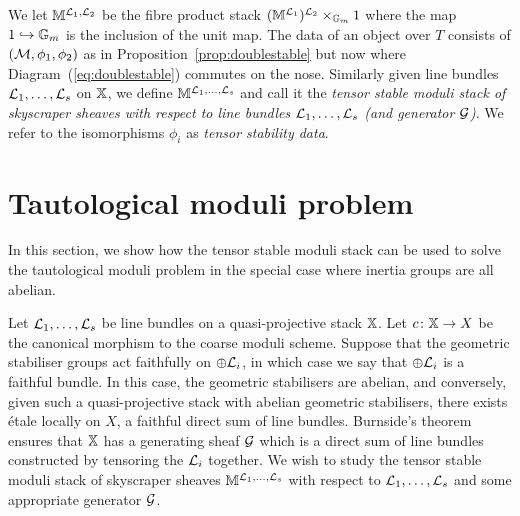 \documentclass[12pt]{amsart}
\begin{document}
\begin{definition}  \label{defn:doubletensor}
We let $\mathbb{M}^{\mathcal{L}_1,\mathcal{L}_2}$ be the fibre product stack $(\mathbb{M}^{\mathcal{L}_1})^{\mathcal{L}_2} \times_{\mathbb{G}_m} 1$ where the map $1 \hookrightarrow \mathbb{G}_m$ is the inclusion of the unit map. The data of an object over $T$ consists of $(\mathcal{M}, \phi_1, \phi_2)$ as in Proposition~\ref{prop:doublestable} but now where Diagram~(\ref{eq:doublestable}) commutes on the nose. Similarly given line bundles $\mathcal{L}_1,\ldots,\mathcal{L}_s$ on $\mathbb{X}$, we define $\mathbb{M}^{\mathcal{L}_1,\ldots,\mathcal{L}_s}$ and call it the {\em tensor stable moduli stack of skyscraper sheaves with respect to line bundles $\mathcal{L}_1, \ldots, \mathcal{L}_s$ (and generator $\mathcal{G}$)}. We refer to the isomorphisms $\phi_i$ as {\em tensor stability data}.
\end{definition}



\section{Tautological moduli problem}

In this section, we show how the tensor stable moduli stack can be used to solve the tautological moduli problem in the special case where inertia groups are all abelian.

Let $\mathcal{L}_1, \ldots, \mathcal{L}_s$ be line bundles on a quasi-projective stack $\mathbb{X}$. Let $c \colon \mathbb{X} \to X$ be the canonical morphism to the coarse moduli scheme. Suppose that the geometric stabiliser groups act faithfully on $\oplus \mathcal{L}_i$, in which case we say that $\oplus \mathcal{L}_i$ is a faithful bundle. In this case, the geometric stabilisers are abelian, and conversely, given such a quasi-projective stack with abelian geometric stabilisers, there exists \'etale locally on $X$, a faithful direct sum of line bundles. Burnside's theorem ensures that $\mathbb{X}$ has a generating sheaf $\mathcal{G}$ which is  a direct sum of line bundles constructed by tensoring the $\mathcal{L}_i$ together. We wish to study the tensor stable moduli stack of skyscraper sheaves $\mathbb{M}^{\mathcal{L}_1,\ldots,\mathcal{L}_s}$ with respect to $\mathcal{L}_1, \ldots, \mathcal{L}_s$ and some appropriate generator $\mathcal{G}$. 
\end{document}
